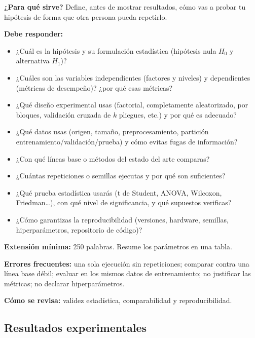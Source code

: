 \begin{guia}
\textbf{¿Para qué sirve?} Define, antes de mostrar resultados, cómo vas a probar tu hipótesis de forma que otra persona
pueda repetirlo.

\textbf{Debe responder:}
\begin{itemize}[nosep,leftmargin=*]
  \item ¿Cuál es la hipótesis y su formulación estadística (hipótesis nula $H_0$ y alternativa $H_1$)?
  \item ¿Cuáles son las variables independientes (factores y niveles) y dependientes (métricas de desempeño)? ¿por qué
        esas métricas?
  \item ¿Qué diseño experimental usas (factorial, completamente aleatorizado, por bloques, validación cruzada de $k$
        pliegues, etc.) y por qué es adecuado?
  \item ¿Qué datos usas (origen, tamaño, preprocesamiento, partición entrenamiento/validación/prueba) y cómo evitas
        fugas de información?
  \item ¿Con qué líneas base o métodos del estado del arte comparas?
  \item ¿Cuántas repeticiones o semillas ejecutas y por qué son suficientes?
  \item ¿Qué prueba estadística usarás (t de Student, ANOVA, Wilcoxon, Friedman\ldots), con qué nivel de significancia, y
        qué supuestos verificas?
  \item ¿Cómo garantizas la reproducibilidad (versiones, hardware, semillas, hiperparámetros, repositorio de código)?
\end{itemize}

\textbf{Extensión mínima:} 250 palabras. Resume los parámetros en una tabla.

\textbf{Errores frecuentes:} una sola ejecución sin repeticiones; comparar contra una línea base débil; evaluar en los
mismos datos de entrenamiento; no justificar las métricas; no declarar hiperparámetros.

\textbf{Cómo se revisa:} validez estadística, comparabilidad y reproducibilidad.
\end{guia}

\subsection{Resultados experimentales} \label{sec:resultados_experimentales} %

